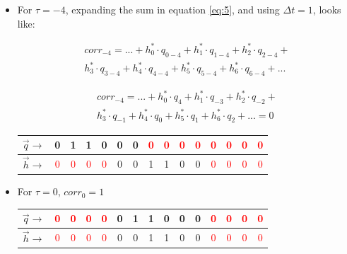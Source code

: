 \begin{itemize}

\item For $\tau = -4$, expanding the sum in equation \ref{eq:5}, and using $\Delta t = 1$, looks like:

\begin{multline}
corr_{-4} = ...+h^{*}_{0}\cdot q_{0-4}+ h^{*}_{1}\cdot q_{1-4} + h^{*}_{2}\cdot q_{2-4}+ \\h^{*}_{3}\cdot q_{3-4} + h^{*}_{4}\cdot q_{4-4} + h^{*}_{5}\cdot q_{5-4} + h^{*}_{6}\cdot q_{6-4}+...
\end{multline}

\begin{multline}
corr_{-4} = ...+h^{*}_{0}\cdot q_{4}+ h^{*}_{1}\cdot q_{-3} + h^{*}_{2}\cdot q_{-2} +\\ h^{*}_{3}\cdot q_{-1} + h^{*}_{4}\cdot q_{0} + h^{*}_{5}\cdot q_{1} + h^{*}_{6}\cdot q_{2}+... = 0
\end{multline}


\begin{center}

\begin{tabular}{c|c|c|c|c| c|c|c|c|c|c |c|c|c|c|}

$\vec{q} \rightarrow$&0&1&1&0&0&0 &\textcolor{red}{0}&\textcolor{red}{0}&\textcolor{red}{0}&\textcolor{red}{0}&\textcolor{red}{0}&\textcolor{red}{0}&\textcolor{red}{0}&\textcolor{red}{0}\\

\hline
$\vec{h} \rightarrow$&\textcolor{red}{0}&\textcolor{red}{0}&\textcolor{red}{0}&\textcolor{red}{0}&0&0&1&1&0&0&\textcolor{red}{0}&\textcolor{red}{0}&\textcolor{red}{0}&\textcolor{red}{0}
\end{tabular}

\end{center}


\item For $\tau = 0$, $corr_{0}=1$

\begin{center}

\begin{tabular}{c |c|c|c|c| c|c|c|c|c|c |c|c|c|c|}
$\vec{q} \rightarrow$&\textcolor{red}{0}&\textcolor{red}{0}&\textcolor{red}{0}&\textcolor{red}{0}
&0&1&1&0&0&0&\textcolor{red}{0}&\textcolor{red}{0}&\textcolor{red}{0}&\textcolor{red}{0}\\
\hline
$\vec{h} \rightarrow$&\textcolor{red}{0}&\textcolor{red}{0}&\textcolor{red}{0}&\textcolor{red}{0}&0&0&1&1&0&0&\textcolor{red}{0}&\textcolor{red}{0}&\textcolor{red}{0}&\textcolor{red}{0}
\end{tabular}


\end{center}
\end{itemize}
